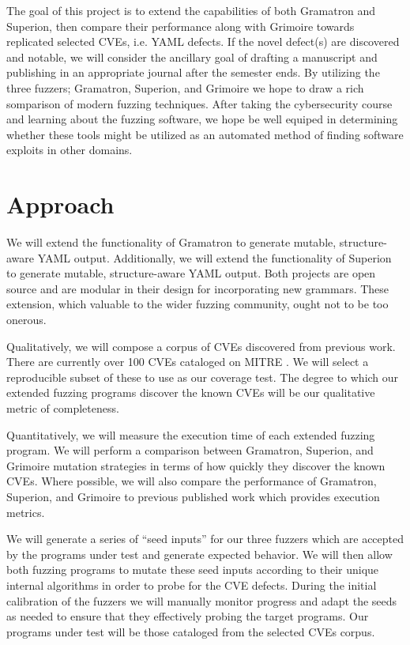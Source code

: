 \documentclass[12pt]{diazessay}
\begin{document}
The goal of this project is to extend the capabilities of both Gramatron and Superion, then compare their performance along with Grimoire towards replicated selected CVEs, i.e. YAML defects.
If the novel defect(s) are discovered and notable, we will consider the ancillary goal of drafting a manuscript and publishing in an appropriate journal after the semester ends.
By utilizing the three fuzzers; Gramatron, Superion, and Grimoire we hope to draw a rich somparison of modern fuzzing techniques.
After taking the cybersecurity course and learning about the fuzzing software, we hope be well equiped in determining whether these tools might be utilized as an automated method of finding software exploits in other domains.



\section*{Approach}

We will extend the functionality of Gramatron to generate mutable, structure-aware YAML output.
Additionally, we will extend the functionality of Superion to generate mutable, structure-aware YAML output.
Both projects are open source and are modular in their design for incorporating new grammars.
These extension, which valuable to the wider fuzzing community, ought not to be too onerous.

Qualitatively, we will compose a corpus of CVEs discovered from previous work.
There are currently over 100 CVEs cataloged on MITRE \cite{MITRE}.
We will select a reproducible subset of these to use as our coverage test.
The degree to which our extended fuzzing programs discover the known CVEs will be our qualitative metric of completeness.

Quantitatively, we will measure the execution time of each extended fuzzing program.
We will perform a comparison between Gramatron, Superion, and Grimoire mutation strategies in terms of how quickly they discover the known CVEs.
Where possible, we will also compare the performance of Gramatron, Superion, and Grimoire to previous published work which provides execution metrics.

We will generate a series of ``seed inputs'' for our three fuzzers which are accepted by the programs under test and generate expected behavior.
We will then allow both fuzzing programs to mutate these seed inputs\cite{Seed} according to their unique internal algorithms in order to probe for the CVE defects.
During the initial calibration of the fuzzers we will manually monitor progress and adapt the seeds as needed to ensure that they effectively probing the target programs.
Our programs under test will be those cataloged from the selected CVEs corpus.
\end{document}
